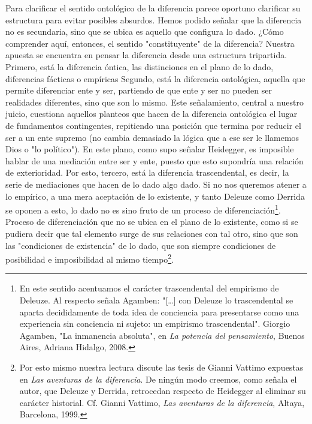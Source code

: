 \documentclass{book}
\begin{document}
Para clarificar el sentido ontológico de la diferencia parece oportuno
clarificar su estructura para evitar posibles absurdos. Hemos podido
señalar que la diferencia no es secundaria, sino que se ubica es aquello
que configura lo dado. ¿Cómo comprender aquí, entonces, el sentido
"constituyente" de la diferencia? Nuestra apuesta se encuentra en pensar
la diferencia desde una estructura tripartida. Primero, está la
diferencia óntica, las distinciones en el plano de lo dado, diferencias
fácticas o empíricas Segundo, está la diferencia ontológica, aquella que
permite diferenciar ente y ser, partiendo de que ente y ser no pueden
ser realidades diferentes, sino que son lo mismo. Este señalamiento,
central a nuestro juicio, cuestiona aquellos planteos que hacen de la
diferencia ontológica el lugar de fundamentos contingentes, repitiendo
una posición que termina por reducir el ser a un ente supremo (no cambia
demasiado la lógica que a ese ser le llamemos Dios o "lo político"). En
este plano, como supo señalar Heidegger, es imposible hablar de una
mediación entre ser y ente, puesto que esto supondría una relación de
exterioridad. Por esto, tercero, está la diferencia trascendental, es
decir, la serie de mediaciones que hacen de lo dado algo dado. Si no nos
queremos atener a lo empírico, a una mera aceptación de lo existente, y
tanto Deleuze como Derrida se oponen a esto, lo dado no es sino fruto de
un proceso de diferenciación\footnote{En este sentido acentuamos el
  carácter trascendental del empirismo de Deleuze. Al respecto señala
  Agamben: "{[}\ldots{]} con Deleuze lo trascendental se aparta
  decididamente de toda idea de conciencia para presentarse como una
  experiencia sin conciencia ni sujeto: un empirismo trascendental".
  Giorgio Agamben, "La inmanencia absoluta", en \emph{La potencia del
  pensamiento}, Buenos Aires, Adriana Hidalgo, 2008.}. Proceso de
diferenciación que no se ubica en el plano de lo existente, como si se
pudiera decir que tal elemento surge de sus relaciones con tal otro,
sino que son las "condiciones de existencia" de lo dado, que son siempre
condiciones de posibilidad e imposibilidad al mismo tiempo\footnote{Por
  esto mismo nuestra lectura discute las tesis de Gianni Vattimo
  expuestas en \emph{Las aventuras de la diferencia}. De ningún modo
  creemos, como señala el autor, que Deleuze y Derrida, retrocedan
  respecto de Heidegger al eliminar su carácter historial. Cf. Gianni
  Vattimo, \emph{Las aventuras de la diferencia}, Altaya, Barcelona,
  1999.}.
\end{document}
